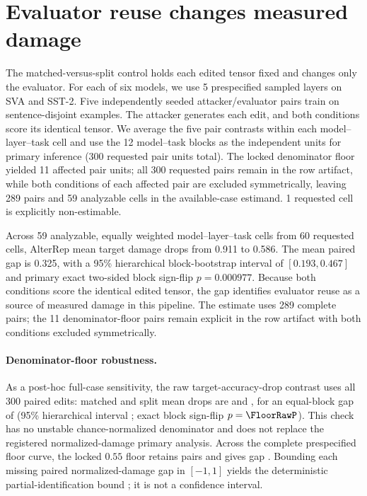 \documentclass{article}
\newcommand{\SplitMatched}{0.911}
\newcommand{\SplitIndependent}{0.586}
\newcommand{\SplitGap}{0.325}
\newcommand{\SplitCI}{$[0.193, 0.467]$}
\newcommand{\SplitP}{0.000977}
\begin{document}
\section{Evaluator reuse changes measured damage}
\label{sec:split}

The matched-versus-split control holds each edited tensor fixed and changes only the evaluator. For each of six models, we use 5 prespecified sampled layers on SVA and SST-2. Five independently seeded attacker/evaluator pairs train on sentence-disjoint examples. The attacker generates each edit, and both conditions score its identical tensor. We average the five pair contrasts within each model--layer--task cell and use the 12 model--task blocks as the independent units for primary inference (300 requested pair units total). The locked denominator floor yielded 11 affected pair units; all 300 requested pairs remain in the row artifact, while both conditions of each affected pair are excluded symmetrically, leaving 289 pairs and 59 analyzable cells in the available-case estimand. 1 requested cell is explicitly non-estimable.

Across 59 analyzable, equally weighted model--layer--task cells from 60 requested cells, AlterRep mean target damage drops from \SplitMatched{} to \SplitIndependent{}. The mean paired gap is \SplitGap{}, with a 95\% hierarchical block-bootstrap interval of \SplitCI{} and primary exact two-sided block sign-flip $p=\SplitP$. Because both conditions score the identical edited tensor, the gap identifies evaluator reuse as a source of measured damage in this pipeline. The estimate uses 289 complete pairs; the 11 denominator-floor pairs remain explicit in the row artifact with both conditions excluded symmetrically.

\paragraph{Denominator-floor robustness.}
As a post-hoc full-case sensitivity, the raw target-accuracy-drop contrast uses all 300 paired edits: matched and split mean drops are \FloorRawMatched{} and \FloorRawSplit{}, for an equal-block gap of \FloorRawGap{} (95\% hierarchical interval \FloorRawCI{}; exact block sign-flip $p=\FloorRawP$). This check has no unstable chance-normalized denominator and does not replace the registered normalized-damage primary analysis. Across the complete prespecified floor curve, the locked $0.55$ floor retains \FloorLockedPairs{} pairs and gives gap \FloorLockedGap{}. Bounding each missing paired normalized-damage gap in $[-1,1]$ yields the deterministic partial-identification bound \FloorPartialBound{}; it is not a confidence interval.
\end{document}
